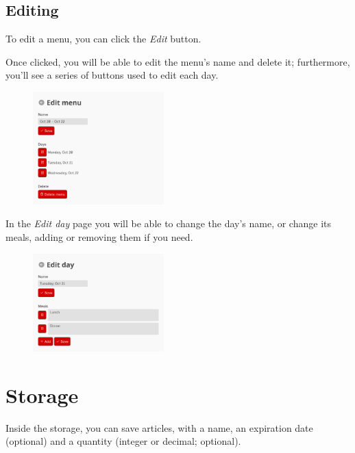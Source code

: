 \documentclass[12pt, a4paper]{article}
\begin{document}
    \subsection{Editing}

    To edit a menu, you can click the \emph{Edit} button.

    Once clicked, you will be able to edit the menu's name and delete it;
    furthermore, you'll see a series of buttons used to edit each day.

    \begin{figure}[H]
        \centering
        \includegraphics[width=0.45\textwidth]{assets/en/menu_edit.png}
    \end{figure}

    In the \emph{Edit day} page you will be able to change the day's name, or
    change its meals, adding or removing them if you need.

    \begin{figure}[H]
        \centering
        \includegraphics[width=0.45\textwidth]{assets/en/menu_day.png}
    \end{figure}



    \section{Storage}

    Inside the storage, you can save articles, with a name, an expiration date
    (optional) and a quantity (integer or decimal; optional).
\end{document}
